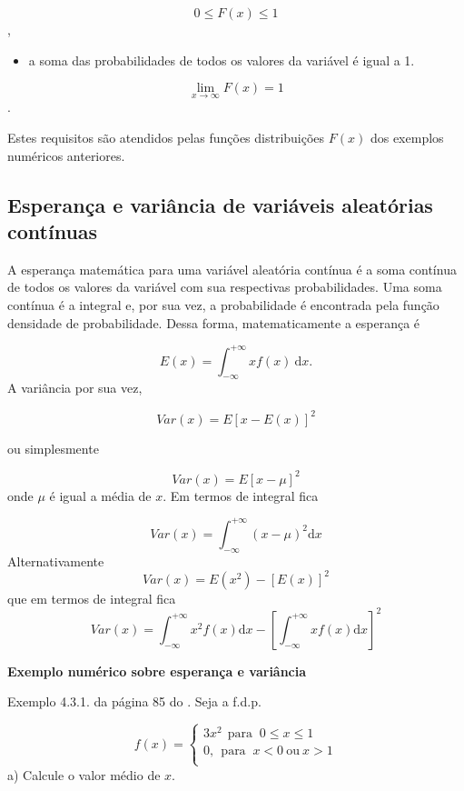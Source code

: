\documentclass[
]{book}
\providecommand{\tightlist}{%
  \setlength{\itemsep}{0pt}\setlength{\parskip}{0pt}}
\begin{document}
\[
  0\leq F(x) \leq 1
\],

\begin{itemize}
\tightlist
\item
  a soma das probabilidades de todos os valores da variável é igual a 1.
\end{itemize}

\[
  \lim_{x \rightarrow \infty} F(x) = 1
\].

Estes requisitos são atendidos pelas funções distribuições \(F(x)\) dos exemplos numéricos anteriores.

\hypertarget{esperanuxe7a-e-variuxe2ncia-de-variuxe1veis-aleatuxf3rias-contuxednuas}{%
\subsection{Esperança e variância de variáveis aleatórias contínuas}\label{esperanuxe7a-e-variuxe2ncia-de-variuxe1veis-aleatuxf3rias-contuxednuas}}

A esperança matemática para uma variável aleatória contínua é a soma contínua de todos os valores da variável com sua respectivas probabilidades. Uma soma contínua é a integral e, por sua vez, a probabilidade é encontrada pela função densidade de probabilidade. Dessa forma, matematicamente a esperança é

\[
  E(x) = \int_{-\infty}^{+\infty} x f(x)~\text{d}x. 
\]
A variância por sua vez,

\[
  Var(x) = E[x - E(x)]^2
\]

ou simplesmente

\[
  Var(x) = E[x - \mu]^2
\]
onde \(\mu\) é igual a média de \(x\). Em termos de integral fica

\[
  Var(x) = \int_{-\infty}^{+\infty} (x- \mu)^2 \text{d}x
\]
Alternativamente
\[
  Var(x) = E(x^2) - [E(x)]^2 
\]
que em termos de integral fica
\[
  Var(x) = \int_{-\infty}^{+\infty} x^2 f(x)\text{d}x - \left[\int_{-\infty}^{+\infty} xf(x) \text{d}x \right]^2
\]

\textbf{Exemplo numérico sobre esperança e variância}

Exemplo 4.3.1. da página 85 do \citet{Sartoris2013}. Seja a f.d.p.

\[
  f(x) = 
    \begin{cases}
      3x^2~~\text{para }~0\leq x \leq 1\\
      0,~~\text{para }~x<0~\text{ou}~x>1\\
    \end{cases}
  \]
a) Calcule o valor médio de \(x\).
\end{document}
